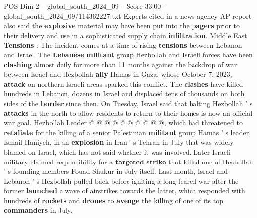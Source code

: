 \begin{textsample}{POS Dim 2 – global\_south\_2024\_09 – Score 33.00 – global\_south\_2024\_09/114362227.txt}
Experts cited in a news agency AP report also said the \textbf{explosive} material may have been put into the \textbf{pagers} prior to their delivery and use in a sophisticated supply chain \textbf{infiltration}.
Middle East \textbf{Tensions} : The incident comes at a time of rising \textbf{tensions} between Lebanon and Israel.
The \textbf{Lebanese} \textbf{militant} group Hezbollah and Israeli forces have been \textbf{clashing} almost daily for more than 11 months against the backdrop of war between Israel and Hezbollah \textbf{ally} Hamas in Gaza, whose October 7, 2023, \textbf{attack} on northern Israeli areas sparked this conflict.
The \textbf{clashes} have killed hundreds in Lebanon, dozens in Israel and displaced tens of thousands on both sides of the \textbf{border} since then.
On Tuesday, Israel said that halting Hezbollah ' s \textbf{attacks} in the north to allow residents to return to their homes is now an official war goal.
Hezbollah Leader @ @ @ @ @ @ @ @ @ @, which had threatened to \textbf{retaliate} for the killing of a senior Palestinian \textbf{militant} group Hamas ' s leader, Ismail Haniyeh, in an \textbf{explosion} in Iran ' s Tehran in July that was widely blamed on Israel, which has not said whether it was involved.
Later Israeli military claimed responsibility for a \textbf{targeted} \textbf{strike} that killed one of Hezbollah ' s founding members Fouad Shukur in July itself.
Last month, Israel and Lebanon ' s Hezbollah pulled back before igniting a long-feared war after the former \textbf{launched} a wave of airstrikes towards the latter, which responded with hundreds of \textbf{rockets} and \textbf{drones} to \textbf{avenge} the killing of one of its top \textbf{commanders} in July.

\end{textsample}
